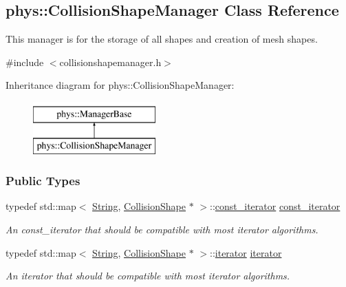 \hypertarget{classphys_1_1CollisionShapeManager}{
\subsection{phys::CollisionShapeManager Class Reference}
\label{classphys_1_1CollisionShapeManager}
}


This manager is for the storage of all shapes and creation of mesh shapes.  




{\ttfamily \#include $<$collisionshapemanager.h$>$}

Inheritance diagram for phys::CollisionShapeManager:\begin{figure}[H]
\begin{center}
\leavevmode
\includegraphics[height=2.000000cm]{classphys_1_1CollisionShapeManager}
\end{center}
\end{figure}
\subsubsection*{Public Types}
\begin{DoxyCompactItemize}
\item 
\hypertarget{classphys_1_1CollisionShapeManager_adaff1c411c3aebf4f8de48bc85ff5a82}{
typedef std::map$<$ \hyperlink{namespacephys_aa03900411993de7fbfec4789bc1d392e}{String}, \hyperlink{classphys_1_1CollisionShape}{CollisionShape} $\ast$ $>$::\hyperlink{classphys_1_1CollisionShapeManager_adaff1c411c3aebf4f8de48bc85ff5a82}{const\_\-iterator} \hyperlink{classphys_1_1CollisionShapeManager_adaff1c411c3aebf4f8de48bc85ff5a82}{const\_\-iterator}}
\label{classphys_1_1CollisionShapeManager_adaff1c411c3aebf4f8de48bc85ff5a82}

\begin{DoxyCompactList}\small\item\em An const\_\-iterator that should be compatible with most iterator algorithms. \item\end{DoxyCompactList}\item 
\hypertarget{classphys_1_1CollisionShapeManager_a2ed1747351ac8bc8d66a433d6f0d9a90}{
typedef std::map$<$ \hyperlink{namespacephys_aa03900411993de7fbfec4789bc1d392e}{String}, \hyperlink{classphys_1_1CollisionShape}{CollisionShape} $\ast$ $>$::\hyperlink{classphys_1_1CollisionShapeManager_a2ed1747351ac8bc8d66a433d6f0d9a90}{iterator} \hyperlink{classphys_1_1CollisionShapeManager_a2ed1747351ac8bc8d66a433d6f0d9a90}{iterator}}
\label{classphys_1_1CollisionShapeManager_a2ed1747351ac8bc8d66a433d6f0d9a90}

\begin{DoxyCompactList}\small\item\em An iterator that should be compatible with most iterator algorithms. \item\end{DoxyCompactList}\end{DoxyCompactItemize}
